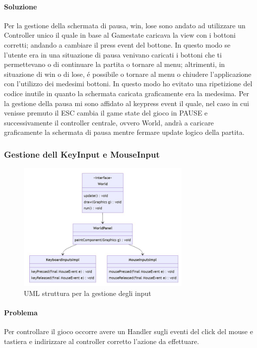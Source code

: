 \documentclass[a4paper,12pt]{report}
\begin{document}
\paragraph{Soluzione} Per la gestione della schermata di pausa, win, lose sono andato ad utilizzare un Controller unico il quale in base al Gamestate caricava la view con i bottoni corretti; andando a cambiare il press event del bottone. In questo modo se l’utente era in una situazione di pausa venivano caricati i bottoni che ti permettevano o di continuare la partita o tornare al menu; altrimenti, in situazione di win o di lose, é possibile o tornare al menu o chiudere l’applicazione con l’utilizzo dei medesimi bottoni. In questo modo ho evitato una ripetizione del codice inutile in quanto la schermata caricata graficamente era la medesima. Per la gestione della pausa mi sono affidato al keypress event il quale, nel caso in cui venisse premuto il ESC cambia il game state del gioco in PAUSE e successivamente il controller centrale, ovvero World, andrà a caricare graficamente la schermata di pausa mentre fermare update logico della partita.

\subsubsection{Gestione dell KeyInput e MouseInput}
\begin{figure}[H]
    \centering{}
    \includegraphics[width=0.75\textwidth]{img/UMLGestioneInput.png}
    \caption{UML struttura per la gestione degli input}
\end{figure}
\paragraph{Problema} Per controllare il gioco occorre avere un Handler sugli eventi del click del mouse e tastiera e indirizzare al controller corretto l’azione da effettuare. 
\end{document}
